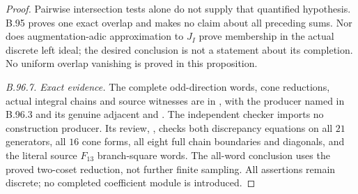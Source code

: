 \begin{proof}
Pairwise intersection tests alone do not supply that quantified
hypothesis.  B.95 proves one exact overlap and makes no claim
about all preceding sums.  Nor does augmentation-adic approximation
to $J_I$ prove membership in the actual discrete left ideal;
the desired conclusion is not a statement about its completion.
No uniform overlap vanishing is proved in this proposition.

\emph{B.96.7. Exact evidence.}
The complete odd-direction words, cone reductions, actual integral
chains and source witnesses are in
,
with the producer named in B.96.3 and its genuine adjacent
 and .  The independent checker
imports no construction producer.  Its review,
,
checks both discrepancy equations on all $21$ generators, all
$16$ cone forms, all eight full chain boundaries and diagonals,
and the literal source $F_{13}$ branch-square words.
The all-word conclusion uses the proved two-coset reduction,
not further finite sampling.  All assertions remain discrete;
no completed coefficient module is introduced.
\end{proof}
